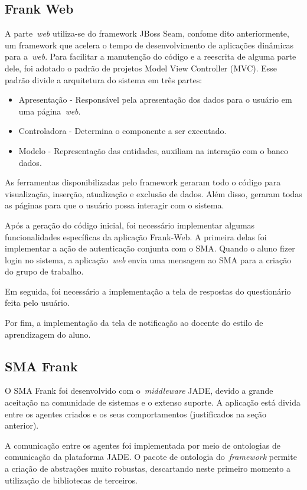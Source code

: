 \subsection{Frank Web}
A parte~\emph{web} utiliza-se do framework JBoss Seam, confome dito anteriormente, um framework que acelera o tempo de desenvolvimento de aplicações dinâmicas para a~\emph{web}. Para facilitar a manutenção do código e a reescrita de alguma parte dele, foi adotado o padrão de projetos
Model View Controller (MVC). Esse padrão divide a arquitetura do sistema em três partes:

\begin{itemize}
	\item Apresentação - Responsável pela apresentação dos dados para o usuário em uma página~\emph{web}.
	\item Controladora - Determina o componente a ser executado.
	\item Modelo - Representação das entidades, auxiliam na interação com o banco dados.
\end{itemize}

As ferramentas disponibilizadas pelo framework geraram todo o código para visualização, inserção, atualização e exclusão de dados. Além disso, geraram todas as páginas para que o usuário possa interagir com o sistema. 

Após a geração do código inicial, foi necessário implementar algumas funcionalidades específicas da aplicação Frank-Web. A primeira delas foi implementar a ação de autenticação conjunta com o SMA. Quando o aluno fizer login no sistema, a aplicação~\emph{web} envia uma mensagem ao SMA para a criação do grupo de trabalho.

Em seguida, foi necessário a implementação a tela de respostas do questionário feita pelo usuário.

Por fim, a implementação da tela de notificação ao docente do estilo de aprendizagem do aluno.

\subsection{SMA Frank}

O SMA Frank foi desenvolvido com o~\emph{middleware} JADE, devido a grande aceitação na comunidade de sistemas e o extenso suporte. A aplicação está divida entre os agentes criados e os seus comportamentos (justificados na seção anterior).

A comunicação entre os agentes foi implementada por meio de ontologias de comunicação da plataforma JADE. O pacote de ontologia do~\emph{framework} permite a criação de abstrações muito robustas, descartando neste primeiro momento a utilização de bibliotecas de terceiros.

